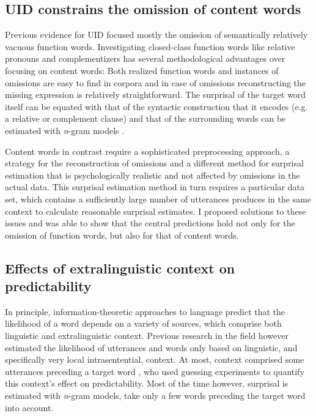 \subsection{UID constrains the omission of content words}
Previous evidence for UID focused mostly the omission of semantically relatively vacuous function words. Investigating closed-class function words like relative pronouns \citep{levy.jaeger2007} and complementizers \citep{jaeger2010} has several methodological advantages over focusing on content words: Both realized function words and instances of omissions are easy to find in corpora and in case of omissions reconstructing the missing expression is relatively straightforward. The surprisal of the target word itself can be equated with that of the syntactic construction that it encodes (e.g. a relative or complement clause) and that of the surrounding words can be estimated with \textit{n}-gram models \citep{levy.jaeger2007}. 

Content words in contrast require a sophisticated preprocessing approach, a strategy for the reconstruction of omissions and a different method for surprisal estimation that is psychologically realistic and not affected by omissions in the actual data. This surprisal estimation method in turn requires a particular data set, which contains a sufficiently large number of utterances produces in the same context to calculate reasonable surprisal estimates. I proposed solutions to these issues and was able to show that the central predictions hold not only for the omission of function words, but also for that of content words.

\subsection{Effects of extralinguistic context on predictability}
In principle, information-theoretic approaches to language predict that the likelihood of a word depends on a variety of sources, which comprise both linguistic and extralinguistic context. Previous research in the field however estimated the likelihood of utterances and words only based on linguistic, and specifically very local intrasentential, context. At most, context comprised some utterances preceding a target word \citep[see e.g.][]{tily.piantadosi2009, kravtchenko2014}, who used guessing experiments \citep{shannon1951} to quantify this context's effect on predictability. Most of the time however, surprisal is estimated with \textit{n}-gram models, take only a few words preceding the target word into account.

